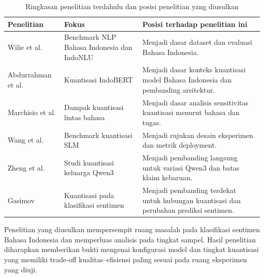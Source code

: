 \begin{table}[H]
  \centering
  \caption{Ringkasan penelitian terdahulu dan posisi penelitian yang diusulkan}
  \label{tab:posisi-penelitian}
  \begin{tabularx}{\textwidth}{p{} p{} X}
    \toprule
    \textbf{Penelitian} & \textbf{Fokus} & \textbf{Posisi terhadap penelitian ini} \\
    \midrule
    Wilie et al. \citep{wilie2020indonlu} & Benchmark NLP Bahasa Indonesia dan IndoNLU & Menjadi dasar dataset dan evaluasi Bahasa Indonesia. \\
    Abdurrahman et al. \citep{abdurrahman2023indobert} & Kuantisasi IndoBERT & Menjadi dasar konteks kuantisasi model Bahasa Indonesia dan pembanding arsitektur. \\
    Marchisio et al. \citep{marchisio2024multilingual} & Dampak kuantisasi lintas bahasa & Menjadi dasar analisis sensitivitas kuantisasi menurut bahasa dan tugas. \\
    Wang et al. \citep{wang2025slmquant} & Benchmark kuantisasi SLM & Menjadi rujukan desain eksperimen dan metrik deployment. \\
    Zheng et al. \citep{zheng2025qwen3} & Studi kuantisasi keluarga Qwen3 & Menjadi pembanding langsung untuk variasi Qwen3 dan batas klaim kebaruan. \\
    Gasimov \citep{gasimov2026sentiment} & Kuantisasi pada klasifikasi sentimen & Menjadi pembanding terdekat untuk hubungan kuantisasi dan perubahan prediksi sentimen. \\
    \bottomrule
  \end{tabularx}
\end{table}

Penelitian yang diusulkan mempersempit ruang masalah pada klasifikasi sentimen Bahasa Indonesia dan memperluas analisis pada tingkat sampel. Hasil penelitian diharapkan memberikan bukti mengenai konfigurasi model dan tingkat kuantisasi yang memiliki trade-off kualitas--efisiensi paling sesuai pada ruang eksperimen yang diuji.
